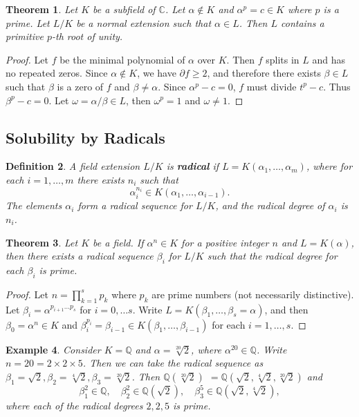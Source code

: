\documentclass[12pt]{article}
\newtheorem{theorem}{Theorem}
\newtheorem{definition}[theorem]{Definition}
\newtheorem{example}[theorem]{Example}
\begin{document}
\begin{theorem} \label{thm:unity-3}
Let $K$ be a subfield of $\mathbb C$. Let $\alpha \notin K$ and $\alpha^p = c \in K$ where $p$ is a prime. Let $L / K$ be a normal extension such that $\alpha \in L$. Then $L$ contains a primitive $p$-th root of unity.
\end{theorem}

\begin{proof}
Let $f$ be the minimal polynomial of $\alpha$ over $K$. Then $f$ splits in $L$ and has no repeated zeros. Since $\alpha \notin K$, we have $\partial f \ge 2$, and therefore there exists $\beta \in L$ such that $\beta$ is a zero of $f$ and $\beta \neq \alpha$. Since $\alpha ^ p - c = 0$, $f$ must divide $t ^ p - c$. Thus $\beta^p - c = 0$. Let $\omega=\alpha / \beta \in L $, then $\omega^p=1$ and $\omega \neq 1$.
\end{proof}


\subsection{Solubility by Radicals}
\begin{definition} \label{def:radical-extension}
    A field extension $L / K$ is \textbf{radical} if $L=K\left(\alpha_1, \ldots, \alpha_m\right)$, where for each $i=1, \ldots, m$ there exists $n_i$ such that
$$
\alpha_i^{n_i} \in K\left(\alpha_1, \ldots, \alpha_{i-1}\right).
$$
The elements $\alpha_i$ form a radical sequence for $L / K$, and the radical degree of $\alpha_i$ is $n_i$.
\end{definition}

\begin{theorem} \label{thm:radical-single-prime}
    Let $K$ be a field. If $\alpha ^ n \in K$ for a positive integer $n$ and  $L = K (\alpha)$, then there exists a radical sequence $\beta_i$ for $L / K$ such that the radical degree for each $\beta_i$ is prime.
\end{theorem}

\begin{proof}
    Let $n = \prod_{k=1}^{s} p_{k}$ where $p_{k}$ are prime numbers (not necessarily distinctive). Let $\beta_{i} = \alpha^ {p_{i + 1} \dots  p_{s}}$ for $i = 0, \dots s$. Write $L = K(\beta_1,  \dots, \beta_s = \alpha)$, and then $\beta_0 = \alpha^n \in K$ and  $\beta_i ^ {p_i} = \beta_{i-1} \in K(\beta_1, \dots, \beta_{i - 1})$ for each $i  = 1, \dots, s$. 
\end{proof}

\begin{example}
    Consider $K  = \mathbb Q$ and $\alpha = \sqrt[20]{2}$, where $\alpha ^ {20} \in \mathbb Q$. Write $n = 20 =  2 \times 2 \times 5 $. Then we can take the radical sequence as $\beta_1 = \sqrt 2, \beta_2 = \sqrt[4]{2}, \beta_3 = \sqrt[20]{2}$. Then $\mathbb Q(\sqrt[20]{2}) $ $= \mathbb Q(\sqrt{2}, \sqrt[4]{2}, \sqrt[20]{2})$ and 
    $$
    \beta_1 ^ 2 \in \mathbb Q, \quad \beta_2 ^ 2 \in \mathbb Q(\sqrt{2}), \quad \beta_3^5 \in \mathbb Q (\sqrt{2}, \sqrt[4]{2}),
    $$
    where each of the radical degrees $2, 2, 5$ is prime.
\end{example}
\end{document}
